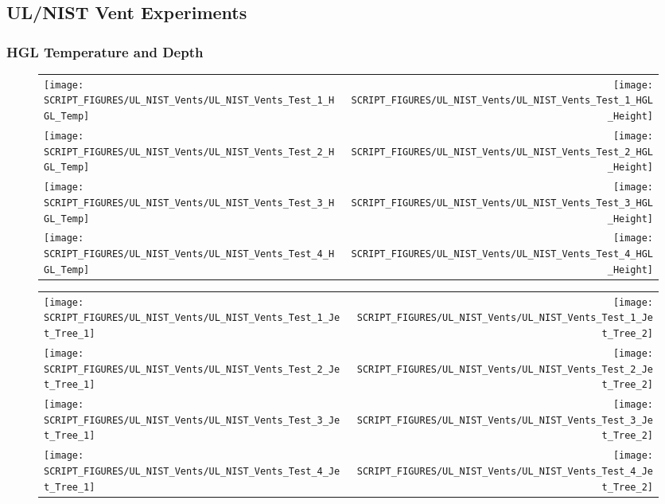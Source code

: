 \clearpage

\subsection{UL/NIST Vent Experiments}

\subsubsection{HGL Temperature and Depth}

\begin{figure}[!ht]
\begin{tabular*}{\textwidth}{l@{\extracolsep{\fill}}r}
\texttt{[image: SCRIPT\_FIGURES/UL\_NIST\_Vents/UL\_NIST\_Vents\_Test\_1\_HGL\_Temp]} &
\texttt{[image: SCRIPT\_FIGURES/UL\_NIST\_Vents/UL\_NIST\_Vents\_Test\_1\_HGL\_Height]} \\
\texttt{[image: SCRIPT\_FIGURES/UL\_NIST\_Vents/UL\_NIST\_Vents\_Test\_2\_HGL\_Temp]} &
\texttt{[image: SCRIPT\_FIGURES/UL\_NIST\_Vents/UL\_NIST\_Vents\_Test\_2\_HGL\_Height]} \\
\texttt{[image: SCRIPT\_FIGURES/UL\_NIST\_Vents/UL\_NIST\_Vents\_Test\_3\_HGL\_Temp]} &
\texttt{[image: SCRIPT\_FIGURES/UL\_NIST\_Vents/UL\_NIST\_Vents\_Test\_3\_HGL\_Height]} \\
\texttt{[image: SCRIPT\_FIGURES/UL\_NIST\_Vents/UL\_NIST\_Vents\_Test\_4\_HGL\_Temp]} &
\texttt{[image: SCRIPT\_FIGURES/UL\_NIST\_Vents/UL\_NIST\_Vents\_Test\_4\_HGL\_Height]}
\end{tabular*}
\end{figure}

\begin{figure}[!ht]
\begin{tabular*}{\textwidth}{l@{\extracolsep{\fill}}r}
\texttt{[image: SCRIPT\_FIGURES/UL\_NIST\_Vents/UL\_NIST\_Vents\_Test\_1\_Jet\_Tree\_1]} &
\texttt{[image: SCRIPT\_FIGURES/UL\_NIST\_Vents/UL\_NIST\_Vents\_Test\_1\_Jet\_Tree\_2]} \\
\texttt{[image: SCRIPT\_FIGURES/UL\_NIST\_Vents/UL\_NIST\_Vents\_Test\_2\_Jet\_Tree\_1]} &
\texttt{[image: SCRIPT\_FIGURES/UL\_NIST\_Vents/UL\_NIST\_Vents\_Test\_2\_Jet\_Tree\_2]} \\
\texttt{[image: SCRIPT\_FIGURES/UL\_NIST\_Vents/UL\_NIST\_Vents\_Test\_3\_Jet\_Tree\_1]} &
\texttt{[image: SCRIPT\_FIGURES/UL\_NIST\_Vents/UL\_NIST\_Vents\_Test\_3\_Jet\_Tree\_2]} \\
\texttt{[image: SCRIPT\_FIGURES/UL\_NIST\_Vents/UL\_NIST\_Vents\_Test\_4\_Jet\_Tree\_1]} &
\texttt{[image: SCRIPT\_FIGURES/UL\_NIST\_Vents/UL\_NIST\_Vents\_Test\_4\_Jet\_Tree\_2]}
\end{tabular*}
\label{UL_NIST_Ceiling_Jet}
\end{figure}

